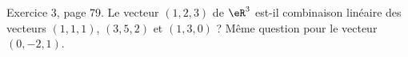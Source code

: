 \begin{exercice}\label{exoLineraire0018}

	Exercice 3, page 79. Le vecteur $(1,2,3)$ de $\eR^3$ est-il combinaison linéaire des vecteurs $(1,1,1)$, $(3,5,2)$ et $(1,3,0)$ ? Même question pour le vecteur $(0,-2,1)$.

\end{exercice}
